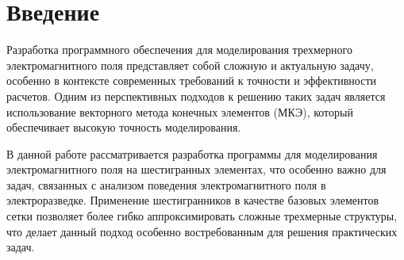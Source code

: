 \chapter*{Введение}


Разработка программного обеспечения для моделирования трехмерного электромагнитного поля представляет собой сложную и актуальную задачу, особенно в контексте современных требований к точности и эффективности расчетов. Одним из перспективных подходов к решению таких задач является использование векторного метода конечных элементов (МКЭ), который обеспечивает высокую точность моделирования. 

В данной работе рассматривается разработка программы для моделирования электромагнитного поля на шестигранных элементах, что особенно важно для задач, связанных с анализом поведения электромагнитного поля в электроразведке. Применение шестигранников в качестве базовых элементов сетки позволяет более гибко аппроксимировать сложные трехмерные структуры, что делает данный подход особенно востребованным для решения практических задач.